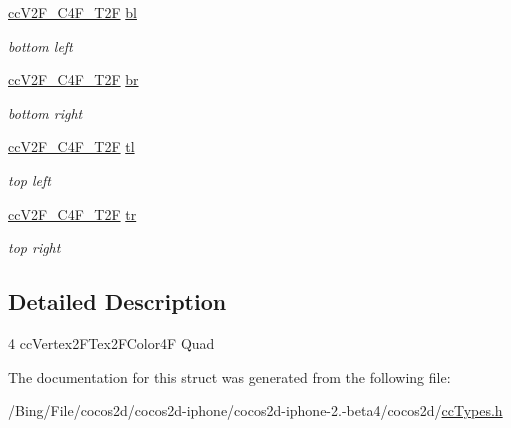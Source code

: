 \begin{DoxyCompactItemize}
\item 
\hypertarget{struct__cc_v2_f___c4_f___t2_f___quad_ab3d7d56d8a4f8559cc112df3efc65ee5}{\hyperlink{cc_types_8h_aa6b60cb391810a8343bfac1feb25cb08}{cc\-V2\-F\-\_\-\-C4\-F\-\_\-\-T2\-F} \hyperlink{struct__cc_v2_f___c4_f___t2_f___quad_ab3d7d56d8a4f8559cc112df3efc65ee5}{bl}}\label{struct__cc_v2_f___c4_f___t2_f___quad_ab3d7d56d8a4f8559cc112df3efc65ee5}

\begin{DoxyCompactList}\small\item\em bottom left \end{DoxyCompactList}\item 
\hypertarget{struct__cc_v2_f___c4_f___t2_f___quad_ad16061b4a7d358eaad4dd6886423536c}{\hyperlink{cc_types_8h_aa6b60cb391810a8343bfac1feb25cb08}{cc\-V2\-F\-\_\-\-C4\-F\-\_\-\-T2\-F} \hyperlink{struct__cc_v2_f___c4_f___t2_f___quad_ad16061b4a7d358eaad4dd6886423536c}{br}}\label{struct__cc_v2_f___c4_f___t2_f___quad_ad16061b4a7d358eaad4dd6886423536c}

\begin{DoxyCompactList}\small\item\em bottom right \end{DoxyCompactList}\item 
\hypertarget{struct__cc_v2_f___c4_f___t2_f___quad_a9a7508bd3aa33313ffcaf758d54340ce}{\hyperlink{cc_types_8h_aa6b60cb391810a8343bfac1feb25cb08}{cc\-V2\-F\-\_\-\-C4\-F\-\_\-\-T2\-F} \hyperlink{struct__cc_v2_f___c4_f___t2_f___quad_a9a7508bd3aa33313ffcaf758d54340ce}{tl}}\label{struct__cc_v2_f___c4_f___t2_f___quad_a9a7508bd3aa33313ffcaf758d54340ce}

\begin{DoxyCompactList}\small\item\em top left \end{DoxyCompactList}\item 
\hypertarget{struct__cc_v2_f___c4_f___t2_f___quad_a958bad4264fd526b87be7d8ca6833f7c}{\hyperlink{cc_types_8h_aa6b60cb391810a8343bfac1feb25cb08}{cc\-V2\-F\-\_\-\-C4\-F\-\_\-\-T2\-F} \hyperlink{struct__cc_v2_f___c4_f___t2_f___quad_a958bad4264fd526b87be7d8ca6833f7c}{tr}}\label{struct__cc_v2_f___c4_f___t2_f___quad_a958bad4264fd526b87be7d8ca6833f7c}

\begin{DoxyCompactList}\small\item\em top right \end{DoxyCompactList}\end{DoxyCompactItemize}


\subsection{Detailed Description}
4 cc\-Vertex2\-F\-Tex2\-F\-Color4\-F Quad 

The documentation for this struct was generated from the following file\-:\begin{DoxyCompactItemize}
\item 
/\-Bing/\-File/cocos2d/cocos2d-\/iphone/cocos2d-\/iphone-\/2.-\/beta4/cocos2d/\hyperlink{cc_types_8h}{cc\-Types.\-h}\end{DoxyCompactItemize}
